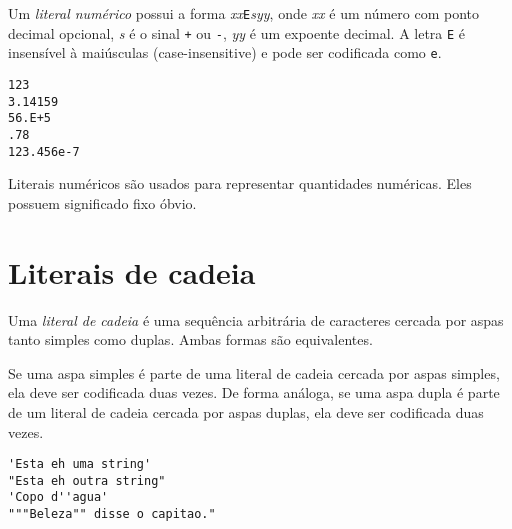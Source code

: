 \documentclass[11pt, brazil]{report}
\def\para#1{\noindent{\bf#1}}
\begin{document}
Um {\it literal numérico} possui a forma {\it xx}{\tt E}{\it syy}, onde
{\it xx} é um número com ponto decimal opcional, {\it s} é o sinal
{\tt+} ou {\tt-}, {\it yy} é um expoente decimal. A letra {\tt E} é
insensível à maiúsculas (case-insensitive) e pode ser codificada como {\tt e}.


\para{Exemplos}

\begin{verbatim}
123
3.14159
56.E+5
.78
123.456e-7
\end{verbatim}

Literais numéricos são usados para representar quantidades numéricas. Eles
possuem significado fixo óbvio.


\section{Literais de cadeia}

Uma {\it literal de cadeia} é uma sequência arbitrária de caracteres cercada
por aspas tanto simples como duplas. Ambas formas são equivalentes.


Se uma aspa simples é parte de uma literal de cadeia cercada por
aspas simples, ela deve ser codificada duas vezes. De forma análoga,
se uma aspa dupla é parte de um literal de cadeia cercada por aspas duplas,
ela deve ser codificada duas vezes.


\para{Exemplos}

\begin{verbatim}
'Esta eh uma string'
"Esta eh outra string"
'Copo d''agua'
"""Beleza"" disse o capitao."
\end{verbatim}
\end{document}
